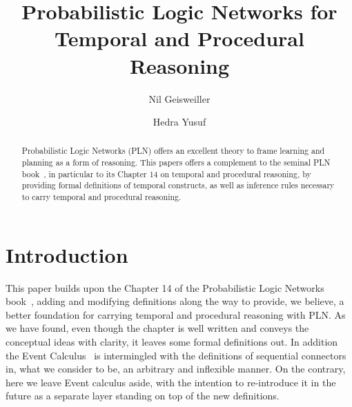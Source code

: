 \documentclass[runningheads]{llncs}
\begin{document}
%
\title{Probabilistic Logic Networks for Temporal and Procedural
  Reasoning}

%
\author{Nil Geisweiller
  \and Hedra Yusuf}
%
%
%
\maketitle              %
%

\begin{abstract}
  Probabilistic Logic Networks (PLN) offers an excellent theory to
  frame learning and planning as a form of reasoning.  This papers
  offers a complement to the seminal PLN book~\cite{Goertzel09PLN}, in
  particular to its Chapter 14 on temporal and procedural reasoning,
  by providing formal definitions of temporal constructs, as well as
  inference rules necessary to carry temporal and procedural
  reasoning.








\end{abstract}

\section{Introduction}
\label{sec:intro}
This paper builds upon the Chapter 14 of the Probabilistic Logic
Networks book~\cite{Goertzel09PLN}, adding and modifying definitions
along the way to provide, we believe, a better foundation for carrying
temporal and procedural reasoning with PLN.  As we have found, even
though the chapter is well written and conveys the conceptual ideas
with clarity, it leaves some formal definitions out.  In addition the
Event Calculus~\cite{Shanahan2000} is intermingled with the
definitions of sequential connectors in, what we consider to be, an
arbitrary and inflexible manner.  On the contrary, here we leave Event
calculus aside, with the intention to re-introduce it in the future as
a separate layer standing on top of the new definitions.
\end{document}
